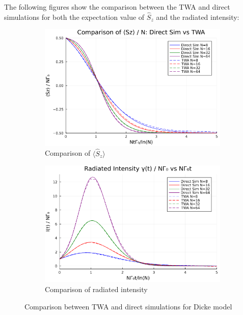 \documentclass{article}
\begin{document}
    The following figures show the comparison between the TWA and direct simulations for both the expectation value of $\hat{S}_z$ and the radiated intensity:
    \begin{figure}[H]
        \centering
        \begin{subfigure}{0.45\textwidth}
            \centering
            \includegraphics[width=\linewidth]{TWA_direct_Sz.png}
            \caption{Comparison of $\langle \hat{S}_z \rangle$}
            \label{fig:subfig1}
        \end{subfigure}
        \hfill
        \begin{subfigure}{0.45\textwidth}
            \centering
            \includegraphics[width=\linewidth]{intensity.png}
            \caption{Comparison of radiated intensity}
            \label{fig:subfig2}
        \end{subfigure}
        \caption{Comparison between TWA and direct simulations for Dicke model}
        \label{fig:overall}
    \end{figure}
\end{document}
